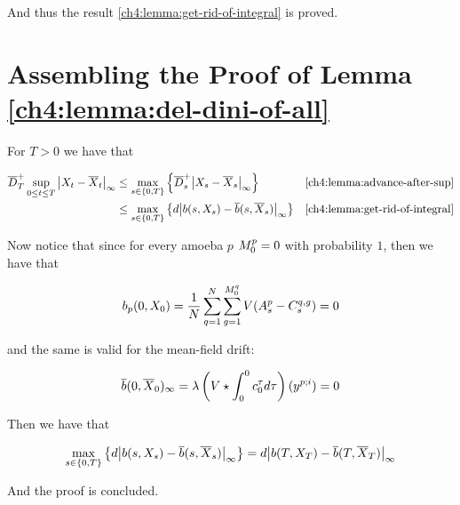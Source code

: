 And thus the result \ref{ch4:lemma:get-rid-of-integral} is proved.

\section{Assembling the Proof of Lemma \ref{ch4:lemma:del-dini-of-all}}\label{ch4:proof:del-dini-of-all}

For $T >0$ we have that

\begin{align*}
	\overline{D}_T^+ \sup_{0 \leq t \leq T} { \left| X_t-\overline{X}_t \right|_{\infty} }
	&\leq
	\max_{ s\in \{0,T\} } 
	\left\{ 
		\overline{D}^+_s { \left| X_s-\overline{X}_s \right|_{\infty} }
	\right\}
	&& \ref{ch4:lemma:advance-after-sup}
	\\
	&\leq \max_{ s\in \{0,T\} } 
	\left\{ 
		d { \left| b(s, X_s) - \overline{b}(s, \overline{X}_s) \right|_{\infty} }
	\right\}
	&& \ref{ch4:lemma:get-rid-of-integral}
\end{align*}

Now notice that since for every amoeba $p$ $M_0^p =0$ with probability $1$, then we have that

\begin{equation*}
	b_p(0, X_0)
	= \frac{1}{N} \sum _{q = 1}^{N} \sum_{g = 1}^{M_0^q} V(A_s^p - C_s^{q,g}) 
	= 0
\end{equation*}

and the same is valid for the mean-field drift:

\begin{equation*}
\overline{b}(0, \overline{X}_0)_\infty
= \lambda \left(V \star \int_0^0 c_0^\tau 	d \tau \right) (y^{p;i})  
= 0
\end{equation*}

Then we have that

\begin{equation*}
	\max_{ s\in \{0,T\} } 
	\left\{ 
	d { \left| b(s, X_s) - \overline{b}(s, \overline{X}_s) \right|_{\infty} }
	\right\}
	= d { \left| b(T, X_T) - \overline{b}(T, \overline{X}_T) \right|_{\infty} } 
\end{equation*}

And the proof is concluded.


